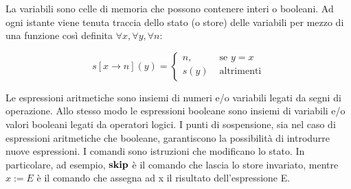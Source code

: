 La variabili sono celle di memoria che possono contenere interi o booleani. Ad ogni istante
viene tenuta traccia dello stato (o store) delle variabili per mezzo di una
funzione così definita
$ \forall x, \forall y, \forall n$:

$$ s[x \rightarrow n](y) =
	\begin{cases} n, & \mbox{ se } y=x \\
				  s(y) & \mbox{ altrimenti}
	\end{cases}
$$

Le espressioni aritmetiche sono insiemi di numeri e/o variabili legati da segni di operazione.
Allo stesso modo le espressioni booleane sono insiemi di variabili e/o valori booleani legati da
operatori logici.
I punti di sospensione, sia nel caso di espressioni aritmetiche che booleane,
garantiscono la possibilità di introdurre nuove espressioni.
I comandi sono istruzioni che modificano lo stato. In particolare, ad esempio,
$\mathop{\textup{\textbf{skip}}}$ è il comando che lascia lo store invariato, mentre $x:=E$ è il comando che 
assegna ad x il risultato dell'espressione E.